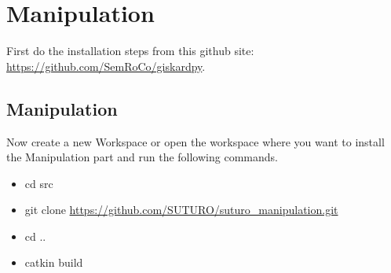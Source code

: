 \documentclass[main.tex]{subfiles}
\begin{document}
\section{Manipulation}

First do the installation steps from this github site:\\
	\url{https://github.com/SemRoCo/giskardpy}.\\
	
	\subsection{Manipulation}
Now create a new Workspace or open the workspace where you want to install the Manipulation part and run the following commands.	
\begin{itemize}
\item cd src
\item git clone \url{https://github.com/SUTURO/suturo_manipulation.git}
\item cd ..
\item catkin build  
\end{itemize}
	
	
\end{document}
